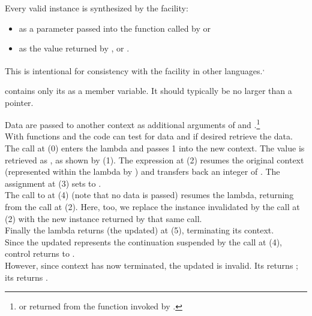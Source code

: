 \newpage
{}\label{design}


Every valid \cont instance is synthesized by the \callcc facility:
\begin{itemize}
\item as a parameter passed into the function called by \callcc or \resumewith
\item as the value returned by \callcc, \resume or \resumewith.
\end{itemize}

This is intentional for consistency with the \cc facility in other
languages.\cite{schemecallcc}\textsuperscript{,}\cite{rubycallcc}


\cont contains only its  as a member variable. It should
typically be no larger than a pointer.

\label{subsec:data}

Data are passed to another context as additional arguments of \callcc and
\resume.\footnote{or returned from the function invoked by \resumewith.}\\
With functions \dataavail and \getdata the code can test for data and if desired
retrieve the data.
The  call at (0) enters the lambda and passes 1 into the
new context. The value is retrieved as , as shown by (1). The expression
 at (2) resumes the original context (represented
within the lambda by ) and transfers back an integer of .
The assignment at (3) sets  to .\\
The call to  at (4) (note that no data is passed) resumes the
lambda, returning from the  call at (2). Here, too,
we replace the \cont instance  invalidated by the \resume call at (2)
with the new instance returned by that same \resume call.\\
Finally the lambda returns (the updated)  at (5), terminating its
context.\\
Since the updated  represents the continuation suspended by the call at
(4), control returns to \main.\\
However, since context  has now terminated, the updated  is
invalid. Its \opbool returns ; its  returns
.\\

